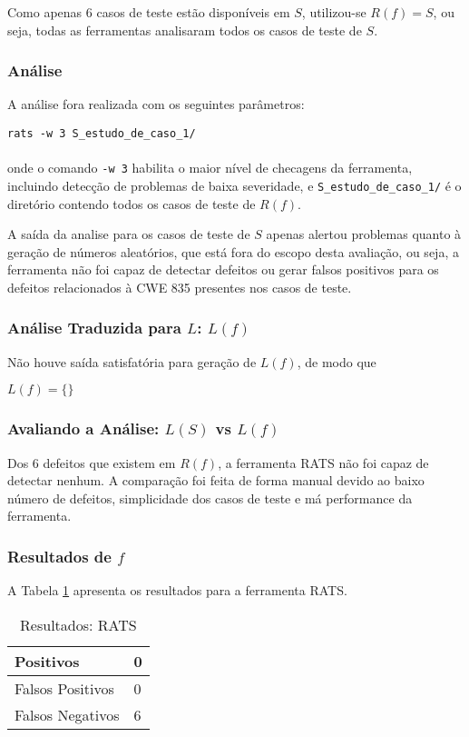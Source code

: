 Como apenas 6 casos de teste estão disponíveis em $S$, utilizou-se $R(f) = S$, ou seja, todas as ferramentas analisaram todos os casos de teste de $S$.

\subsubsection{Análise}

A análise fora realizada com os seguintes parâmetros:

\lstinline{rats -w 3 S_estudo_de_caso_1/}\\\\
onde o comando \lstinline{-w 3} habilita o maior nível de checagens da ferramenta, incluindo detecção de problemas de baixa severidade, e \lstinline{S_estudo_de_caso_1/} é o diretório contendo todos os casos de teste de $R(f)$.

A saída da analise para os casos de teste de $S$ apenas alertou problemas quanto à geração de números aleatórios, que está fora do escopo desta avaliação, ou seja, a ferramenta não foi capaz de detectar defeitos ou gerar falsos positivos para os defeitos relacionados à CWE 835 presentes nos casos de teste.

\subsubsection{Análise Traduzida para $L$: $L(f)$}

Não houve saída satisfatória para geração de $L(f)$, de modo que 

$L(f) = \lbrace\rbrace$

\subsubsection{Avaliando a Análise: $L(S)$ vs $L(f)$}

Dos 6 defeitos que existem em $R(f)$, a ferramenta RATS não foi capaz de detectar nenhum. A comparação foi feita de forma manual devido ao baixo número de defeitos, simplicidade dos casos de teste e má performance da ferramenta.

\subsubsection{Resultados de $f$}

A Tabela \ref{tabela_rats} apresenta os resultados para a ferramenta RATS.
\begin{table}[h]
\caption{Resultados: RATS}
  \centering
\begin{tabular}{l | l}
  \hline
  Positivos & 0 \\ \hline
  Falsos Positivos & 0 \\ \hline
  Falsos Negativos & 6 \\
  \hline
\end{tabular}
\label{tabela_rats}
\end{table}

